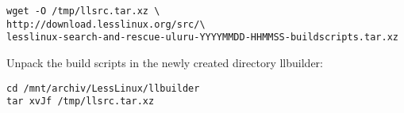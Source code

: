 \begin{verbatim}wget -O /tmp/llsrc.tar.xz \
http://download.lesslinux.org/src/\
lesslinux-search-and-rescue-uluru-YYYYMMDD-HHMMSS-buildscripts.tar.xz\end{verbatim}

Unpack the build scripts in the newly created directory llbuilder:

\begin{verbatim}cd /mnt/archiv/LessLinux/llbuilder
tar xvJf /tmp/llsrc.tar.xz\end{verbatim}







